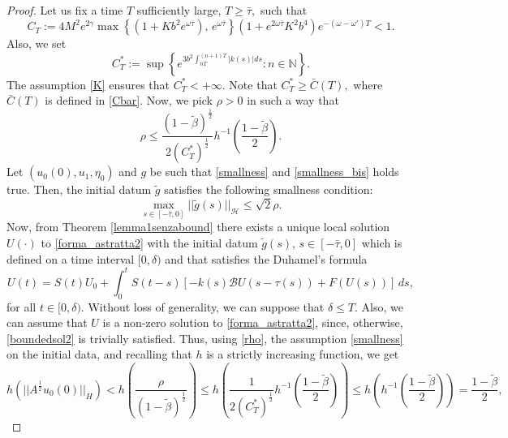 \documentclass[10pt,a4paper]{amsart}
\renewcommand{\geq}{\geqslant}
\renewcommand{\ge}{\geqslant}
\renewcommand{\leq}{\leqslant}
\begin{document}
\begin{proof}
	Let us fix a time $T$ sufficiently large, $T\ge \bar{\tau},$ such that
	\begin{equation}\label{CT}
		C_T:=4M^2e^{2\gamma}\max\left\{(1+Kb^2e^{\omega\bar{\tau}}),\, e^{\omega\bar{\tau}}\right\}\left(1+e^{2\omega\bar{\tau}}K^2b^4\right)e^{-(\omega-\omega')T}<1.
	\end{equation}
 Also, we set 
\begin{equation}\label{C*}
	C^*_T:=\sup\left\{e^{3b^2\int_{nT}^{(n+1)T}\lvert k(s)\rvert ds}: n\in \mathbb{N}\right\}.
\end{equation}
The assumption \eqref{K} ensures that  $C^*_T<+\infty.$
Note that  $C^*_T\ge \bar{C}(T),$ where $\bar{C}(T)$ is defined in \eqref{Cbar}.
Now, we pick $\rho>0$ in such a way that 
\begin{equation}\label{rho}
	\rho\leq \frac{(1-\tilde{\beta})^{\frac{1}{2}}}{2(C^*_T)^{\frac{1}{2}}}h^{-1}\left(\frac{1-\tilde{\beta}}{2}\right).
\end{equation} 
Let $(u_0(0),u_1,\eta_0)$ and $g$ be such that \eqref{smallness} and \eqref{smallness_bis}   holds true. Then, the initial datum $\tilde{g}$  satisfies the following smallness condition:
\begin{equation}\label{smallness2}
	\max_{s\in [-\bar{\tau},0]}||\tilde g(s)||_{\mathcal H}\leq \sqrt{2} \rho.
\end{equation}
Now, from Theorem \ref{lemma1senzabound} there exists a unique local solution $U(\cdot)$ to \eqref{forma_astratta2} with the initial datum $\tilde{g}(s)$, $s\in[-\bar{\tau},0]$ which is defined on a time interval $[0,\delta)$ and that satisfies the Duhamel's formula
\begin{equation}\label{primasol}
	U(t)=S(t)U_0+\int_{0}^{t}S(t-s)[-k(s)\mathcal{B}U(s-\tau(s))+F(U(s))]\,ds,
\end{equation} 
for all $t\in [0,\delta)$. Without loss of generality, we can suppose that $\delta\leq T$. Also, we can assume that $U$ is a non-zero solution to \eqref{forma_astratta2}, since, otherwise, \eqref{boundedsol2} is trivially satisfied. Thus, using \eqref{rho}, the assumption \eqref{smallness} on the initial data,
 and recalling that $h$ is a strictly increasing function, we get
$$h(||A^{\frac{1}{2}}u_0(0)||_{H})< h\left(\frac{\rho}{(1-\tilde{\beta})^{\frac{1}{2}}}\right)\leq h\left(\frac{1}{2(C_T^*)^{\frac{1}{2}}}h^{-1}\left(\frac{1-\tilde{\beta}}{2}\right)\right)\leq h\left(h^{-1}\left(\frac{1-\tilde{\beta}}{2}\right)\right)=\frac{1-\tilde{\beta}}{2},$$

\end{proof}
\end{document}
